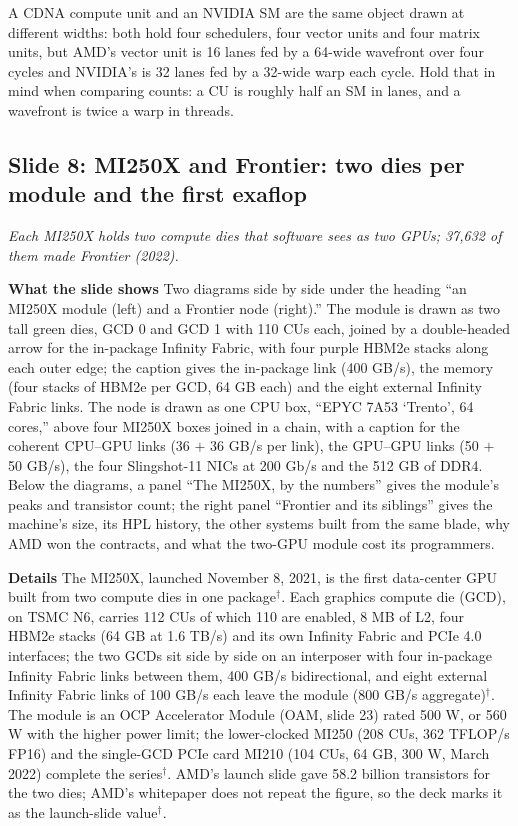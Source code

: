 \documentclass[11pt,letterpaper]{article}
\newcommand{\slide}[3]{%
  \subsection[Slide #1: #2]{Slide #1: #2}%
  {\color{muted}\itshape #3\par}\medskip}
\newcommand{\para}[1]{\medskip\noindent\textbf{#1}\quad}
\newenvironment{intuition}{\begin{tcolorbox}[intuitionbox]}{\end{tcolorbox}}
\begin{document}
\begin{intuition}
A CDNA compute unit and an NVIDIA SM are the same object drawn at different widths: both hold four schedulers, four vector units and four matrix units, but AMD's vector unit is 16 lanes fed by a 64-wide wavefront over four cycles and NVIDIA's is 32 lanes fed by a 32-wide warp each cycle. Hold that in mind when comparing counts: a CU is roughly half an SM in lanes, and a wavefront is twice a warp in threads.
\end{intuition}

\slide{8}{MI250X and Frontier: two dies per module and the first exaflop}{Each MI250X holds two compute dies that software sees as two GPUs; 37,632 of them made Frontier (2022).}

\para{What the slide shows} Two diagrams side by side under the heading ``an MI250X module (left) and a Frontier node (right).'' The module is drawn as two tall green dies, GCD 0 and GCD 1 with 110 CUs each, joined by a double-headed arrow for the in-package Infinity Fabric, with four purple HBM2e stacks along each outer edge; the caption gives the in-package link (400 GB/s), the memory (four stacks of HBM2e per GCD, 64 GB each) and the eight external Infinity Fabric links. The node is drawn as one CPU box, ``EPYC 7A53 `Trento', 64 cores,'' above four MI250X boxes joined in a chain, with a caption for the coherent CPU--GPU links (36 $+$ 36 GB/s per link), the GPU--GPU links (50 $+$ 50 GB/s), the four Slingshot-11 NICs at 200 Gb/s and the 512 GB of DDR4. Below the diagrams, a panel ``The MI250X, by the numbers'' gives the module's peaks and transistor count; the right panel ``Frontier and its siblings'' gives the machine's size, its HPL history, the other systems built from the same blade, why AMD won the contracts, and what the two-GPU module cost its programmers.

\para{Details} The MI250X, launched November 8, 2021, is the first data-center GPU built from two compute dies in one package$^\dagger$. Each graphics compute die (GCD), on TSMC N6, carries 112 CUs of which 110 are enabled, 8 MB of L2, four HBM2e stacks (64 GB at 1.6 TB/s) and its own Infinity Fabric and PCIe 4.0 interfaces; the two GCDs sit side by side on an interposer with four in-package Infinity Fabric links between them, 400 GB/s bidirectional, and eight external Infinity Fabric links of 100 GB/s each leave the module (800 GB/s aggregate)$^\dagger$. The module is an OCP Accelerator Module (OAM, slide 23) rated 500 W, or 560 W with the higher power limit; the lower-clocked MI250 (208 CUs, 362 TFLOP/s FP16) and the single-GCD PCIe card MI210 (104 CUs, 64 GB, 300 W, March 2022) complete the series$^\dagger$. AMD's launch slide gave 58.2 billion transistors for the two dies; AMD's whitepaper does not repeat the figure, so the deck marks it as the launch-slide value$^\dagger$.
\end{document}
